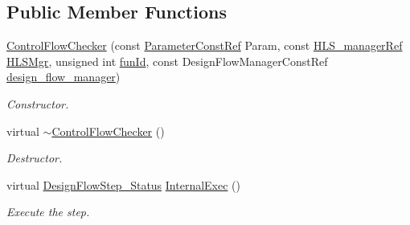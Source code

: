 \subsection*{Public Member Functions}
\begin{DoxyCompactItemize}
\item 
\hyperlink{classControlFlowChecker_a8c9d01857ece3fcfbd56bac8bd9abb44}{Control\+Flow\+Checker} (const \hyperlink{Parameter_8hpp_a37841774a6fcb479b597fdf8955eb4ea}{Parameter\+Const\+Ref} Param, const \hyperlink{hls__manager_8hpp_acd3842b8589fe52c08fc0b2fcc813bfe}{H\+L\+S\+\_\+manager\+Ref} \hyperlink{classHLS__step_ade85003a99d34134418451ddc46a18e9}{H\+L\+S\+Mgr}, unsigned int \hyperlink{classHLSFunctionStep_a3e6434fd86c698b0c70520b859bff5b0}{fun\+Id}, const Design\+Flow\+Manager\+Const\+Ref \hyperlink{classDesignFlowStep_ab770677ddf087613add30024e16a5554}{design\+\_\+flow\+\_\+manager})
\begin{DoxyCompactList}\small\item\em Constructor. \end{DoxyCompactList}\item 
virtual \hyperlink{classControlFlowChecker_a98263e2a12532dcd9a9ea377cfe64dfd}{$\sim$\+Control\+Flow\+Checker} ()
\begin{DoxyCompactList}\small\item\em Destructor. \end{DoxyCompactList}\item 
virtual \hyperlink{design__flow__step_8hpp_afb1f0d73069c26076b8d31dbc8ebecdf}{Design\+Flow\+Step\+\_\+\+Status} \hyperlink{classControlFlowChecker_ac563bc1d94b92827854435787625d8a5}{Internal\+Exec} ()
\begin{DoxyCompactList}\small\item\em Execute the step. \end{DoxyCompactList}\end{DoxyCompactItemize}

